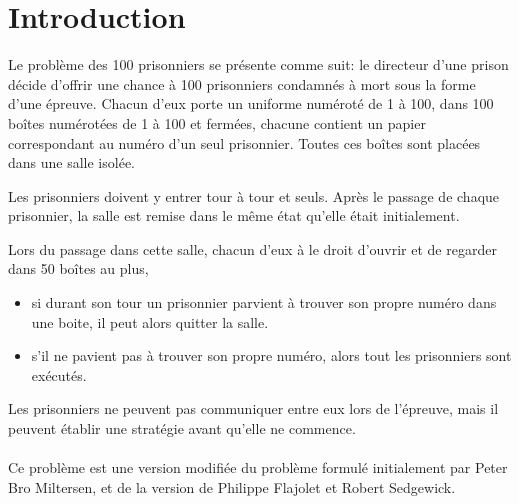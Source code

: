 \section{Introduction}

Le problème des 100 prisonniers se présente comme suit:
le directeur d'une prison décide d'offrir une chance à 100 prisonniers
condamnés à mort sous la forme d'une épreuve.
Chacun d'eux porte un uniforme numéroté de 1 à 100, dans 100 boîtes
numérotées de 1 à 100 et fermées, chacune contient un papier correspondant
au numéro d'un seul prisonnier.
Toutes ces boîtes sont placées dans une salle isolée. 

Les prisonniers doivent y entrer tour à tour et seuls.
Après le passage de chaque prisonnier, la salle est remise dans le même
état qu'elle était initialement.

Lors du passage dans cette salle, chacun d'eux à le droit d'ouvrir
et de regarder dans 50 boîtes au plus,

\begin{itemize}
    \item 
    si durant son tour un prisonnier parvient à trouver son propre numéro
    dans une boite, il peut alors quitter la salle.
    \item
    s'il ne pavient pas à trouver son propre numéro, alors tout les
    prisonniers sont exécutés.
\end{itemize}

Les prisonniers ne peuvent pas communiquer entre eux lors de l'épreuve,
mais il peuvent établir une stratégie avant qu'elle ne commence.\\\\
Ce problème est une version modifiée du problème formulé initialement par
Peter Bro Miltersen, et de la version de Philippe Flajolet et Robert Sedgewick.
